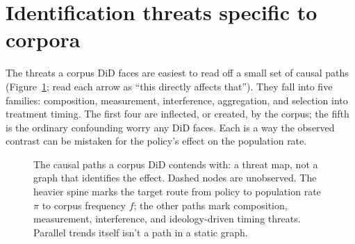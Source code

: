 \section{Identification threats specific to corpora}
\label{sec:threats}

The threats a corpus DiD faces are easiest to read off a small set of causal paths (Figure~\ref{fig:threat-dag}; read each arrow as \enquote{this directly affects that}). They fall into five families: composition, measurement, interference, aggregation, and selection into treatment timing. The first four are inflected, or created, by the corpus; the fifth is the ordinary confounding worry any DiD faces. Each is a way the observed contrast can be mistaken for the policy's effect on the population rate.

\begin{figure}[t]
\centering
{}
\caption{The causal paths a corpus DiD contends with: a threat map, not a graph that identifies the effect. Dashed nodes are unobserved. The heavier spine marks the target route from policy to population rate $\pi$ to corpus frequency $f$; the other paths mark composition, measurement, interference, and ideology-driven timing threats. Parallel trends itself isn't a path in a static graph.}
\label{fig:threat-dag}
\end{figure}


